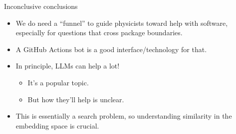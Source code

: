 \documentclass[aspectratio=169]{beamer}
\begin{document}
\begin{frame}{Inconclusive conclusions}
\Large
\vspace{0.3 cm}
\begin{itemize}\setlength{\itemsep}{0.5 cm}
\item<1-> We do need a ``funnel'' to guide physicists toward help with software, especially for questions that cross package boundaries.
\item<2-> A GitHub Actions bot is a good interface/technology for that.
\item<3-> In principle, LLMs can help a lot!
\vspace{0.25 cm}
\begin{itemize}\Large\setlength{\itemsep}{0.25 cm}
\item \Large It's a popular topic.
\item \Large But how they'll help is unclear.
\end{itemize}
\item<4-> This is essentially a search problem, so understanding similarity in the embedding space is crucial.
\end{itemize}
\end{frame}
\end{document}
